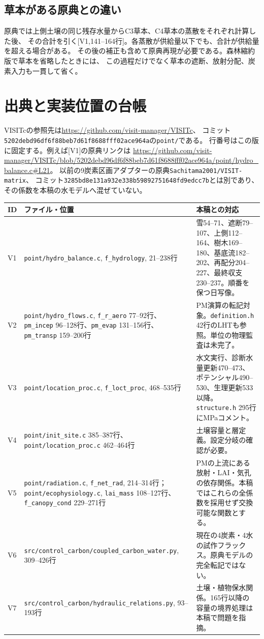 \documentclass[a4paper,11pt]{ltjsarticle}
\newcommand{\code}[1]{\nolinkurl{#1}}
\begin{document}
\subsection{草本がある原典との違い}
原典では上側土壌の同じ残存水量からC3草本、C4草本の蒸散をそれぞれ計算した後、
その合計を引く[V1,141--164行]。各蒸散が供給量以下でも、合計が供給量を超える場合がある。
その後の補正も含めて原典再現が必要である。森林縮約版で草本を省略したときには、
この過程だけでなく草本の遮断、放射分配、炭素入力も一貫して省く。

\section{出典と実装位置の台帳}\label{app:sources}
VISITcの参照先は\url{https://github.com/visit-manager/VISITc}、
コミット\code{5202debd96df6f88beb7d61f8688fff02ace964a}の\code{point/}である。
行番号はこの版に固定する。例えば[V1]の原典リンクは
\url{https://github.com/visit-manager/VISITc/blob/5202debd96df6f88beb7d61f8688fff02ace964a/point/hydro_balance.c#L21}。
以前の9炭素区画アダプターの原典\code{Sachitama2001/VISIT-matrix}、
コミット\code{3285bd8e131a932e338b59892751648fd9edcc7b}とは別であり、
その係数を本稿の水モデルへ混ぜていない。
\begin{longtable}{p{.07\linewidth}p{.40\linewidth}p{.46\linewidth}}
\toprule ID & ファイル・位置 & 本稿との対応\\\midrule\endhead
V1 & \code{point/hydro_balance.c}, \code{f_hydrology}, 21--238行 & 雪54--71、遮断79--107、上側112--164、樹木169--180、基底流182--202、再配分204--227、最終収支230--237。順番を保つ日写像。\\
V2 & \code{point/hydro_flows.c}, \code{f_r_aero} 77--92行、\code{pm_incep} 96--128行、\code{pm_evap} 131--156行、\code{pm_transp} 159--200行 & PM演算の転記対象。\code{definition.h} 42行のLHTも参照。単位の物理監査は未完了。\\
V3 & \code{point/location_proc.c}, \code{f_loct_proc}, 468--535行 & 水文実行、診断水量更新470--473、ポテンシャル490--530、生理更新533以降。\code{structure.h} 295行にMPaコメント。\\
V4 & \code{point/init_site.c} 385--387行、\code{point/location_proc.c} 462--464行 & 土壌容量と層定義。設定分岐の確認が必要。\\
V5 & \code{point/radiation.c}, \code{f_net_rad}, 214--314行；\code{point/ecophysiology.c}, \code{lai_mass} 108--127行、\code{f_canopy_cond} 229--271行 & PMの上流にある放射・LAI・気孔の依存関係。本稿ではこれらの全係数を採用せず交換可能な関数とする。\\
V6 & \code{src/control_carbon/coupled_carbon_water.py}, 309--426行 & 現在の4炭素・4水の試作フラックス。原典モデルの完全転記ではない。\\
V7 & \code{src/control_carbon/hydraulic_relations.py}, 93--193行 & 土壌・植物保水関係。165行以降の容量の境界処理は本稿で問題を指摘。\\
\bottomrule
\end{longtable}
\end{document}
